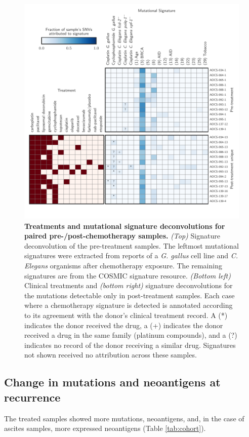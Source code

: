 \begin{figure}[htbp]
\centering
\includegraphics[scale=1.0]{figures/signatures.pdf}
\caption{\textbf{Treatments and mutational signature deconvolutions for paired pre-/post-chemotherapy samples.} \textit{(Top)} Signature deconvolution of the pre-treatment samples. The leftmost mutational signatures were extracted from reports of a \textit{G. gallus}\cite{Szikriszt_2016} cell line and \textit{C. Elegans}\cite{Meier_2014} organisms after chemotherapy exposure. The remaining signatures are from the COSMIC signature resource\cite{364242}. \textit{(Bottom left)} Clinical treatments and \textit{(bottom right)} signature deconvolutions for the mutations detectable only in post-treatment samples. Each case where a chemotherapy signature is detected is annotated according to its agreement with the donor's clinical treatment record. A (*) indicates the donor received the drug, a (+) indicates the donor received a drug in the same family (platinum compounds), and a (?) indicates no record of the donor receiving a similar drug. Signatures not shown received no attribution across these samples.}
\label{fig:signatures}
\end{figure}

\subsection*{Change in mutations and neoantigens at recurrence}
The treated samples showed more mutations, neoantigens, and, in the case of ascites samples, more expressed neoantigens (Table \ref{tab:cohort}).

